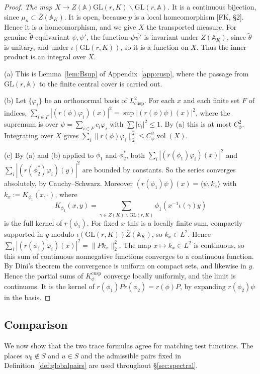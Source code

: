 \documentclass[12pt]{article}
\newcommand{\ov}[1]{\overline{#1}}
\newcommand{\A}{\mathbb{A}}
\newcommand{\vol}{\operatorname{vol}}
\newcommand{\GL}{\mathrm{GL}}
\newcommand{\Zb}{\ov{Z}}
\theoremstyle{plain}
\theoremstyle{definition}
\begin{document}
\begin{proof}
\emph{The map $X\to Z(\A)\GL(r,K)\backslash\GL(r,\A)$.} It is a continuous bijection, since $\mu_n\subset\Zb(\A_K)$. It is open, because $p$ is a local homeomorphism [FK, \S2]. Hence it is a homeomorphism, and we give $X$ the transported measure. For genuine $\tilde\theta$-equivariant $\psi,\psi'$, the function $\psi\ov{\psi'}$ is invariant under $\Zb(\A_K)$, since $\tilde\theta$ is unitary, and under $\iota(\GL(r,K))$, so it is a function on $X$. Thus the inner product is an integral over $X$.

(a) This is Lemma~\ref{lem:Bsup} of Appendix~\ref{app:cusp}, where the passage from $\GL(r,\A)$ to the finite central cover is carried out.

(b) Let $\{\varphi_i\}$ be an orthonormal basis of $L^2_{\mathrm{cusp}}$. For each $x$ and each finite set $F$ of indices, $\sum_{i\in F}|(r(\phi)\varphi_i)(x)|^2=\sup|(r(\phi)\psi)(x)|^2$, where the supremum is over $\psi=\sum_{i\in F}c_i\varphi_i$ with $\sum|c_i|^2\le1$. By (a) this is at most $C_\phi^2$. Integrating over $X$ gives $\sum_i\|r(\phi)\varphi_i\|_2^2\le C_\phi^2\vol(X)$.

(c) By (a) and (b) applied to $\phi_1$ and $\phi_2^*$, both $\sum_i|(r(\phi_1)\varphi_i)(x)|^2$ and $\sum_i|(r(\phi_2^*)\varphi_i)(y)|^2$ are bounded by constants. So the series converges absolutely, by Cauchy--Schwarz. Moreover $(r(\phi_1)\psi)(x)=\langle\psi,k_x\rangle$ with $k_x:=\ov{K_{\phi_1}(x,\cdot)}$, where \[ K_{\phi_1}(x,y)=\sum_{\gamma\in Z(K)\backslash\GL(r,K)}\phi_1(x^{-1}\iota(\gamma)y) \] is the full kernel of $r(\phi_1)$. For fixed $x$ this is a locally finite sum, compactly supported in $y$ modulo $\iota(\GL(r,K))\Zb(\A_K)$, so $k_x\in L^2$. Hence $\sum_i|(r(\phi_1)\varphi_i)(x)|^2=\|Pk_x\|_2^2$. The map $x\mapsto k_x\in L^2$ is continuous, so this sum of continuous nonnegative functions converges to a continuous function. By Dini's theorem the convergence is uniform on compact sets, and likewise in $y$. Hence the partial sums of $K^{\mathrm{cusp}}_\phi$ converge locally uniformly, and the limit is continuous. It is the kernel of $r(\phi_1)Pr(\phi_2)=r(\phi)P$, by expanding $r(\phi_2)\psi$ in the basis.
\end{proof}

\subsection{Comparison}\label{subsec:comparison}
We now show that the two trace formulas agree for matching test functions. The places $w_0\notin S$ and $u\in S$ and the admissible pairs fixed in Definition~\ref{def:globalpairs} are used throughout \S\ref{sec:spectral}.
\end{document}
